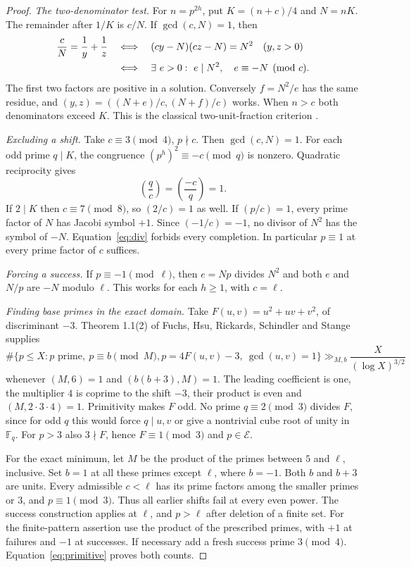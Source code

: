 \documentclass[a4paper,11pt]{article}
\theoremstyle{definition}\newtheorem{question}[theorem]{Question}
\newcommand{\E}{\mathcal E}
\newcommand{\jac}[2]{\left(\frac{#1}{#2}\right)}
\begin{document}
\begin{proof}
\emph{The two-denominator test.}
For $n=p^{2h}$, put $K=(n+c)/4$ and $N=nK$. The remainder after $1/K$ is $c/N$. If $\gcd(c,N)=1$, then
\begin{align}
 \frac{c}{N}=\frac1y+\frac1z
 &\quad\Longleftrightarrow\quad
 (cy-N)(cz-N)=N^2\quad(y,z>0) \notag\\
 &\quad\Longleftrightarrow\quad
 \exists\ e>0:\ e\mid N^2,\quad e\equiv-N\pmod c . \label{eq:div}
\end{align}
The first two factors are positive in a solution. Conversely $f=N^2/e$ has the same residue, and $(y,z)=((N+e)/c,(N+f)/c)$ works. When $n>c$ both denominators exceed $K$. This is the classical two-unit-fraction criterion \cite{hv}.

\emph{Excluding a shift.}
Take $c\equiv3\pmod4$, $p\nmid c$. Then $\gcd(c,N)=1$. For each odd prime $q\mid K$, the congruence $(p^h)^2\equiv-c\pmod q$ is nonzero. Quadratic reciprocity gives
\begin{equation}\label{eq:recip}
 \jac{q}{c}=\jac{-c}{q}=1.
\end{equation}
If $2\mid K$ then $c\equiv7\pmod8$, so $(2/c)=1$ as well. If $(p/c)=1$, every prime factor of $N$ has Jacobi symbol $+1$. Since $(-1/c)=-1$, no divisor of $N^2$ has the symbol of $-N$. Equation~\eqref{eq:div} forbids every completion. In particular $p\equiv1$ at every prime factor of $c$ suffices.

\emph{Forcing a success.}
If $p\equiv-1\pmod\ell$, then $e=Np$ divides $N^2$ and both $e$ and $N/p$ are $-N$ modulo $\ell$. This works for each $h\ge1$, with $c=\ell$.

\emph{Finding base primes in the exact domain.}
Take $F(u,v)=u^2+uv+v^2$, of discriminant $-3$. Theorem 1.1(2) of Fuchs, Hsu, Rickards, Schindler and Stange \cite{fhrss} supplies
\begin{equation}\label{eq:primitive}
 \#\{p\le X:p\text{ prime},\ p\equiv b\pmod M,       p=4F(u,v)-3,\ \gcd(u,v)=1\}
 \gg_{M,b} \frac{X}{(\log X)^{3/2}}
\end{equation}
whenever $(M,6)=1$ and $(b(b+3),M)=1$. The leading coefficient is one, the multiplier $4$ is coprime to the shift $-3$, their product is even and $(M,2\cdot3\cdot4)=1$. Primitivity makes $F$ odd. No prime $q\equiv2\pmod3$ divides $F$, since for odd $q$ this would force $q\mid u,v$ or give a nontrivial cube root of unity in $\mathbb F_q$. For $p>3$ also $3\nmid F$, hence $F\equiv1\pmod3$ and $p\in\E$.

For the exact minimum, let $M$ be the product of the primes between $5$ and $\ell$, inclusive. Set $b=1$ at all these primes except $\ell$, where $b=-1$. Both $b$ and $b+3$ are units. Every admissible $c<\ell$ has its prime factors among the smaller primes or $3$, and $p\equiv1\pmod3$. Thus all earlier shifts fail at every even power. The success construction applies at $\ell$, and $p>\ell$ after deletion of a finite set. For the finite-pattern assertion use the product of the prescribed primes, with $+1$ at failures and $-1$ at successes. If necessary add a fresh success prime $3\pmod4$. Equation~\eqref{eq:primitive} proves both counts.
\end{proof}
\end{document}
